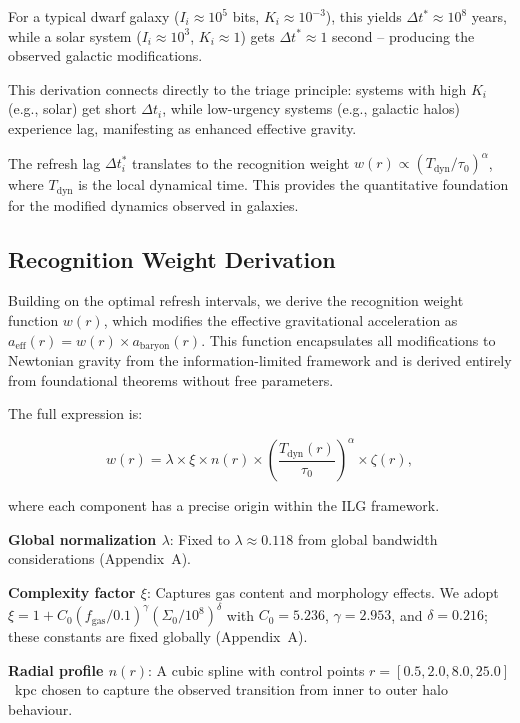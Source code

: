 \documentclass[12pt,a4paper]{article}
\begin{document}
For a typical dwarf galaxy ($I_i \approx 10^5$ bits, $K_i \approx 10^{-3}$), this yields $\Delta t^* \approx 10^8$ years, while a solar system ($I_i \approx 10^3$, $K_i \approx 1$) gets $\Delta t^* \approx 1$ second – producing the observed galactic modifications.

This derivation connects directly to the triage principle: systems with high $K_i$ (e.g., solar) get short $\Delta t_i$, while low-urgency systems (e.g., galactic halos) experience lag, manifesting as enhanced effective gravity.

The refresh lag $\Delta t_i^*$ translates to the recognition weight $w(r) \propto (T_\mathrm{dyn}/\tau_0)^\alpha$, where $T_\mathrm{dyn}$ is the local dynamical time. This provides the quantitative foundation for the modified dynamics observed in galaxies.

\subsection{Recognition Weight Derivation}

Building on the optimal refresh intervals, we derive the recognition weight function $w(r)$, which modifies the effective gravitational acceleration as $a_\mathrm{eff}(r) = w(r) \times a_\mathrm{baryon}(r)$. This function encapsulates all modifications to Newtonian gravity from the information-limited framework and is derived entirely from foundational theorems without free parameters.

The full expression is:

\begin{equation}
w(r) = \lambda \times \xi \times n(r) \times \left(\frac{T_\mathrm{dyn}(r)}{\tau_0}\right)^\alpha \times \zeta(r),
\end{equation}

where each component has a precise origin within the ILG framework.

\textbf{Global normalization $\lambda$}: Fixed to $\lambda \approx 0.118$ from global bandwidth considerations (Appendix~A).

\textbf{Complexity factor $\xi$}: Captures gas content and morphology effects. We adopt\\ $\xi = 1 + C_0 (f_\mathrm{gas}/0.1)^\gamma (\Sigma_0 / 10^8)^\delta$ with $C_0 = 5.236$, $\gamma = 2.953$, and $\delta = 0.216$; these constants are fixed globally (Appendix~A).

\textbf{Radial profile $n(r)$}: A cubic spline with control points $r = [0.5, 2.0, 8.0, 25.0]$~kpc chosen to capture the observed transition from inner to outer halo behaviour.
\end{document}
